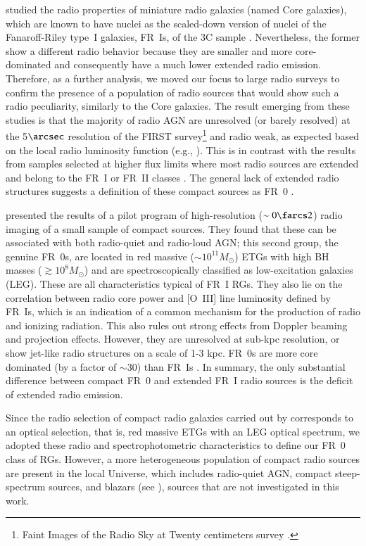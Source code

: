 \documentclass[traditabstract]{aa}
\begin{document}
\citet{baldi09} studied the radio properties of miniature radio
galaxies (named Core galaxies), which are known to have nuclei as the
scaled-down version of nuclei of the Fanaroff-Riley type~I galaxies,
FR\ Is, of the 3C sample \citep{balmaverde06core}. Nevertheless, the
former show a different radio behavior because they are smaller and
more core-dominated and consequently have a much lower extended radio
emission. Therefore, as a further analysis, we moved our focus to
large radio surveys to confirm the presence of a population of radio
sources that would show such a radio peculiarity, similarly to the
Core galaxies. The result emerging from these studies \citep{baldi09,
  baldi10b} is that the majority of radio AGN are unresolved (or
barely resolved) at the 5$\arcsec$ resolution of the FIRST
survey\footnote{Faint Images of the Radio Sky at Twenty centimeters
  survey \citep{becker95,helfand15}.} and radio weak, as expected
based on the local radio luminosity function (e.g.,
\citealt{best05b,pracy16}). This is in contrast with the results from samples
selected at higher flux limits where most radio sources are extended
and belong to the FR~I or FR~II classes \citep{fanaroff74}. The
general lack of extended radio structures suggests a definition of
these compact sources as FR~0 \citep{ghisellini11,baldi15}.


\citet{baldi15} presented the results of a pilot program of
high-resolution ($\sim 0\farcs2$) radio imaging of a small sample of
compact sources. They found that these can be associated with both
radio-quiet and radio-loud AGN; this second group, the genuine FR~0s,
are located in red massive ($\sim 10^{11} M_\odot$) ETGs with high BH
masses ($\gtrsim 10^8 M_\odot$) and are spectroscopically classified
as low-excitation galaxies (LEG). These are all characteristics
typical of FR~I RGs. They also lie on the correlation between radio
core power and [O~III] line luminosity defined by FR~Is, which is an
indication of a common mechanism for the production of radio and
ionizing radiation. This also rules out strong effects from Doppler
beaming and projection effects. However, they are unresolved at
sub-kpc resolution, or show jet-like radio structures on a scale of
1-3 kpc.  FR~0s are more core dominated (by a factor of $\sim$30) than
FR~Is \citep{baldi15}. In summary, the only substantial difference
between compact FR~0 and extended FR~I radio sources is the deficit of
extended radio emission.

Since the radio selection of compact radio galaxies carried out by
\citet{baldi10b} corresponds to an optical selection, that is, red
massive ETGs with an LEG optical spectrum, we adopted these radio and
spectrophotometric characteristics to define our FR~0 class of
RGs. However, a more heterogeneous population of compact radio sources
are present in the local Universe, which includes radio-quiet AGN, compact
steep-spectrum sources, and blazars (see \citealt{sadler14}), sources
that are not investigated in this work.
\end{document}
